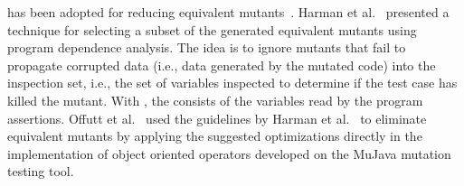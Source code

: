  has been adopted for reducing equivalent mutants~\cite{voas1997software, hierons1999using, harman2001relationship}. Harman et al.~\cite{harman2001relationship} presented a technique 
for selecting a subset of the generated equivalent mutants using program dependence analysis. 
The idea is to 
ignore
mutants that fail to propagate corrupted data (i.e., data generated by the mutated code)
into the inspection set, i.e., the set of variables inspected to determine if the test case has killed the mutant. With , the  consists of the variables read by the program assertions.
Offutt et al.~\cite{offutt2006class} used the guidelines by Harman et al.~\cite{harman2001relationship} to eliminate equivalent mutants by applying the suggested optimizations directly in the implementation of object oriented operators developed on the MuJava mutation testing tool. 

